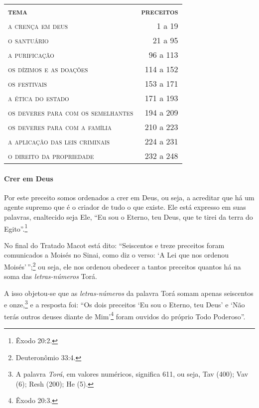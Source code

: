\vspace*{\fill}
\thispagestyle{empty}
\begin{tabular}{lr}
\textbf{\textsc{tema}} & \textbf{\textsc{preceitos}} \\
\textsc{a crença em deus} & 1 a 19 \\
\textsc{o santuário} & 21 a 95 \\
\textsc{a purificação} & 96 a 113 \\
\textsc{os dízimos e as doações} & 114 a 152 \\
\textsc{os festivais} & 153 a 171 \\
\textsc{a ética do estado} & 171 a 193 \\
\textsc{os deveres para com os semelhantes} & 194 a 209 \\
\textsc{os deveres para com a família} & 210 a 223 \\
\textsc{a aplicação das leis criminais} & 224 a 231 \\
\textsc{o direito da propriedade} & 232 a 248
\end{tabular}

\@openrighttrue\makeatother \endgroup

\pagebreak
\movetooddpage


\setcounter{paragraph}{0}
\setcounter{secnumdepth}{4}

\paragraph{Crer em Deus}

Por este preceito somos ordenados a crer em Deus, ou seja, a acreditar
que há um agente supremo que é o criador de tudo o que existe. Ele está
expresso em suas palavras, enaltecido seja Ele, ``Eu sou o Eterno, teu
Deus, que te tirei da terra do Egito''.\footnote{Êxodo 20:2.}

No final do Tratado Macot está dito: ``Seiscentos e treze preceitos
foram comunicados a Moisés no Sinai, como diz o verso: `A Lei que nos
ordenou Moisés'\,'';\footnote{Deuteronômio 33:4.} ou seja, ele nos ordenou obedecer a tantos preceitos quantos há na soma das \emph{letras-números} Torá. 

A isso objetou-se que as \emph{letras-números} da palavra Torá somam apenas seiscentos e onze,\footnote{A palavra \emph{Torá}, em valores numéricos, significa 611, ou seja, Tav (400); Vav (6); Resh (200); He (5).} e a resposta foi: ``Os dois preceitos `Eu sou o Eterno, teu Deus' e `Não terás outros
deuses diante de Mim'\footnote{Êxodo 20:3.} foram ouvidos do próprio Todo
Poderoso''.

